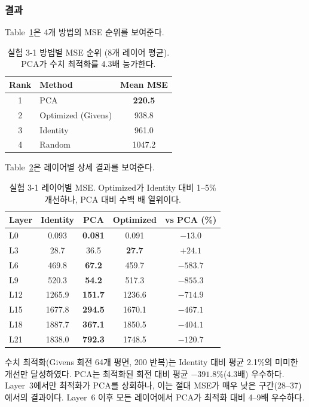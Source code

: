 \documentclass[11pt,a4paper]{article}
\begin{document}
\subsubsection{결과}

Table~\ref{tab:exp31_rank}은 4개 방법의 MSE 순위를 보여준다.

\begin{table}[H]
\centering
\caption{실험 3-1 방법별 MSE 순위 (8개 레이어 평균). PCA가 수치 최적화를 4.3배 능가한다.}
\label{tab:exp31_rank}
\begin{tabular}{clc}
\toprule
\textbf{Rank} & \textbf{Method} & \textbf{Mean MSE} \\
\midrule
1 & PCA & \textbf{220.5} \\
2 & Optimized (Givens) & 938.8 \\
3 & Identity & 961.0 \\
4 & Random & 1047.2 \\
\bottomrule
\end{tabular}
\end{table}

Table~\ref{tab:exp31_layer}은 레이어별 상세 결과를 보여준다.

\begin{table}[H]
\centering
\caption{실험 3-1 레이어별 MSE. Optimized가 Identity 대비 1--5\% 개선하나, PCA 대비 수백 배 열위이다.}
\label{tab:exp31_layer}
\begin{tabular}{lcccc}
\toprule
\textbf{Layer} & \textbf{Identity} & \textbf{PCA} & \textbf{Optimized} & \textbf{vs PCA (\%)} \\
\midrule
L0 & 0.093 & \textbf{0.081} & 0.091 & $-13.0$ \\
L3 & 28.7 & 36.5 & \textbf{27.7} & $+24.1$ \\
L6 & 469.8 & \textbf{67.2} & 459.7 & $-583.7$ \\
L9 & 520.3 & \textbf{54.2} & 517.3 & $-855.3$ \\
L12 & 1265.9 & \textbf{151.7} & 1236.6 & $-714.9$ \\
L15 & 1677.8 & \textbf{294.5} & 1670.1 & $-467.1$ \\
L18 & 1887.7 & \textbf{367.1} & 1850.5 & $-404.1$ \\
L21 & 1838.0 & \textbf{792.3} & 1748.5 & $-120.7$ \\
\bottomrule
\end{tabular}
\end{table}

수치 최적화(Givens 회전 64개 평면, 200 반복)는 Identity 대비 평균 2.1\%의 미미한 개선만 달성하였다.
PCA는 최적화된 회전 대비 평균 $-391.8\%$(4.3배) 우수하다.
Layer~3에서만 최적화가 PCA를 상회하나, 이는 절대 MSE가 매우 낮은 구간(28--37)에서의 결과이다.
Layer~6 이후 모든 레이어에서 PCA가 최적화 대비 4--9배 우수하다.
\end{document}
